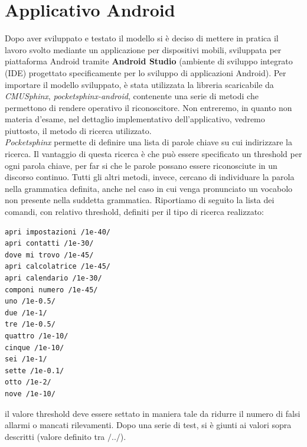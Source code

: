 \documentclass[12pt]{article}
\begin{document}
\section{Applicativo Android}
Dopo aver sviluppato e testato il modello si è deciso di mettere in pratica il lavoro svolto mediante un applicazione per dispositivi mobili, sviluppata per piattaforma Android tramite \textbf{Android Studio} (ambiente di sviluppo integrato (IDE) progettato specificamente per lo sviluppo di applicazioni Android).
Per importare il modello sviluppato, è stata utilizzata la libreria scaricabile da \textit{CMUSphinx}, \textit{pocketsphinx-android}, contenente una serie di metodi che permettono di rendere operativo il riconoscitore.
Non entreremo, in quanto non materia d'esame, nel dettaglio implementativo dell'applicativo, vedremo piuttosto, il metodo di ricerca utilizzato.\\
\textit{Pocketsphinx} permette di definire una lista di parole chiave su cui indirizzare la ricerca. Il vantaggio di questa ricerca è che può essere specificato un threshold per ogni parola chiave, per far si che le parole possano essere riconosciute in un discorso continuo. Tutti gli altri metodi, invece,  cercano di individuare la parola nella grammatica definita, anche nel caso in cui venga pronunciato un vocabolo non presente nella suddetta grammatica. Riportiamo di seguito la lista dei comandi, con relativo threshold, definiti per il tipo di ricerca realizzato:
\begin{lstlisting}
apri impostazioni /1e-40/
apri contatti /1e-30/
dove mi trovo /1e-45/
apri calcolatrice /1e-45/
apri calendario /1e-30/
componi numero /1e-45/
uno /1e-0.5/
due /1e-1/
tre /1e-0.5/
quattro /1e-10/
cinque /1e-10/
sei /1e-1/
sette /1e-0.1/
otto /1e-2/
nove /1e-10/
\end{lstlisting}
il valore threshold deve essere settato in maniera tale da ridurre il numero di falsi allarmi o mancati rilevamenti. Dopo una serie di test, si è giunti ai valori sopra descritti (valore definito tra $/../$).
\end{document}
